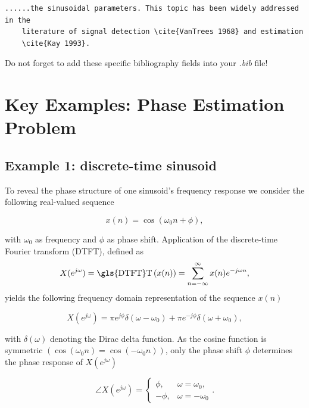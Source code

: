 \begin{mdframed}
	\begin{lstlisting}[language = Tex, caption={Add citations into your text}]
	......the sinusoidal parameters. This topic has been widely addressed in the 
	literature of signal detection \cite{VanTrees 1968} and estimation 
	\cite{Kay 1993}.
	\end{lstlisting}
	Do not forget to add these specific bibliography fields into your \emph{.bib} file!
\end{mdframed}

\section{Key Examples: Phase Estimation Problem}\label{ch3:PE1}
\subsection{Example 1: discrete-time sinusoid}
\noindent To reveal the phase structure of one sinusoid's frequency response we consider the following real-valued sequence

\begin{equation}
	\label{eq:c3.1}
	x(n)=\cos(\omega_0n+\phi),
\end{equation}

\noindent with $\omega_0$ as frequency and $\phi$ as phase shift. Application of the discrete-time Fourier transform (\gls{DTFT}), defined as
\begin{equation}\label{eq:c3.2}
X(e^{j\omega})=\text{\gls{DTFT}T}\left(x(n)\right)=\sum_{n=-\infty}^{\infty}x(n)e^{-j\omega n},
\end{equation}
yields the following frequency domain representation of the sequence $x(n)$

\begin{equation}\label{eq:c3.3}
X(e^{j\omega})=\pi e^{j\phi}\delta(\omega-\omega_0)+\pi e^{-j\phi}\delta(\omega+\omega_0),
\end{equation}

\noindent with $\delta(\omega)$ denoting the Dirac delta function. As the cosine function is symmetric $\left(\cos(\omega_0 n)=\cos(-\omega_0 n)\right)$, only the phase shift $\phi$ determines the phase response of $X(e^{j\omega})$

\begin{equation}\label{eq:c3.4}
\angle X(e^{j\omega})=\begin{cases}\phi, & \omega=\omega_0,\\
-\phi, & \omega=-\omega_0
\end{cases}.
\end{equation}

